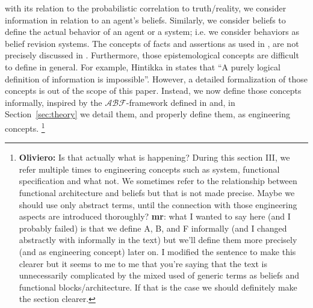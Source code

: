 \documentclass[conference]{IEEEtran}
\newcommand{\fixnote}[2]{\textbf{\color{red}{FIX}}\footnote{{\bf #1:} #2}}
\newcommand{\assertionRegion}{\mathcal{A}}
\newcommand{\beliefRegion}{\mathcal{B}}
\newcommand{\factRegion}{\mathcal{F}}
\newcommand{\abftheory}{\assertionRegion\beliefRegion\factRegion}
\begin{document}
with its relation to the probabilistic correlation to truth/reality, we
consider information in relation to an agent's beliefs. Similarly, we consider
beliefs to define the actual behavior of an agent or a system; i.e. we consider
behaviors as belief revision systems.
The concepts of facts and assertions as used in \autocite{Santaca2016abf}, are
not precisely discussed in \autocite{Santaca2016abf}.  Furthermore, those
epistemological concepts are difficult to define
\autocite{Gettier2012knowledge} in general.
For example, Hintikka in
\autocite{Hintikka1993Information} states that ``A purely logical definition of
information is impossible''. However, a detailed formalization of those concepts is out
of the scope of this paper. 
Instead, we now define those concepts informally, inspired by the
$\abftheory$-framework  defined in \autocite{Santaca2016abf} and, in
Section~\ref{sec:theory} we detail them, and properly define them, as engineering concepts.
\fixnote{Oliviero}{Is that actually what is happening? During this section III, we refer multiple times to engineering concepts such as system, functional specification and what not. We sometimes refer to the relationship between functional architecture and beliefs but that is not made precise. Maybe we should use only abstract terms, until the connection with those engineering aspects are introduced thoroughly? {\bf mr}: what I wanted to say here (and I probably failed) is that we define A, B, and F informally (and I changed abstractly with informally in the text) but we'll define them more precisely (and as engineering concept) later on. I modified the sentence to make this clearer but it seems to me to me that you're saying that the text is unnecessarily complicated by the mixed used of generic terms as beliefs and functional blocks/architecture. If that is the case we should definitely make the section clearer.}
\end{document}
